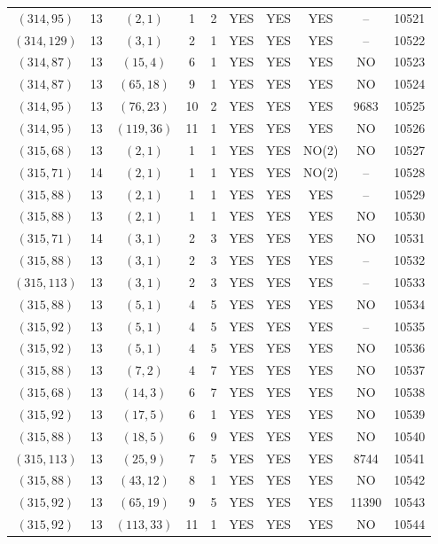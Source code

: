 \begin{longtable}{|c|c|c|c|c|c|c|c|c|c|}
$(314, 95)$ & 13 & $(2, 1)$ & 1 & 2 & YES & YES & YES & -- & 10521\\
$(314, 129)$ & 13 & $(3, 1)$ & 2 & 1 & YES & YES & YES & -- & 10522\\
$(314, 87)$ & 13 & $(15, 4)$ & 6 & 1 & YES & YES & YES & NO & 10523\\
$(314, 87)$ & 13 & $(65, 18)$ & 9 & 1 & YES & YES & YES & NO & 10524\\
$(314, 95)$ & 13 & $(76, 23)$ & 10 & 2 & YES & YES & YES & 9683 & 10525\\
$(314, 95)$ & 13 & $(119, 36)$ & 11 & 1 & YES & YES & YES & NO & 10526\\
$(315, 68)$ & 13 & $(2, 1)$ & 1 & 1 & YES & YES & NO(2) & NO & 10527\\
$(315, 71)$ & 14 & $(2, 1)$ & 1 & 1 & YES & YES & NO(2) & -- & 10528\\
$(315, 88)$ & 13 & $(2, 1)$ & 1 & 1 & YES & YES & YES & -- & 10529\\
$(315, 88)$ & 13 & $(2, 1)$ & 1 & 1 & YES & YES & YES & NO & 10530\\
$(315, 71)$ & 14 & $(3, 1)$ & 2 & 3 & YES & YES & YES & NO & 10531\\
$(315, 88)$ & 13 & $(3, 1)$ & 2 & 3 & YES & YES & YES & -- & 10532\\
$(315, 113)$ & 13 & $(3, 1)$ & 2 & 3 & YES & YES & YES & -- & 10533\\
$(315, 88)$ & 13 & $(5, 1)$ & 4 & 5 & YES & YES & YES & NO & 10534\\
$(315, 92)$ & 13 & $(5, 1)$ & 4 & 5 & YES & YES & YES & -- & 10535\\
$(315, 92)$ & 13 & $(5, 1)$ & 4 & 5 & YES & YES & YES & NO & 10536\\
$(315, 88)$ & 13 & $(7, 2)$ & 4 & 7 & YES & YES & YES & NO & 10537\\
$(315, 68)$ & 13 & $(14, 3)$ & 6 & 7 & YES & YES & YES & NO & 10538\\
$(315, 92)$ & 13 & $(17, 5)$ & 6 & 1 & YES & YES & YES & NO & 10539\\
$(315, 88)$ & 13 & $(18, 5)$ & 6 & 9 & YES & YES & YES & NO & 10540\\
$(315, 113)$ & 13 & $(25, 9)$ & 7 & 5 & YES & YES & YES & 8744 & 10541\\
$(315, 88)$ & 13 & $(43, 12)$ & 8 & 1 & YES & YES & YES & NO & 10542\\
$(315, 92)$ & 13 & $(65, 19)$ & 9 & 5 & YES & YES & YES & 11390 & 10543\\
$(315, 92)$ & 13 & $(113, 33)$ & 11 & 1 & YES & YES & YES & NO & 10544\\

\end{longtable}
